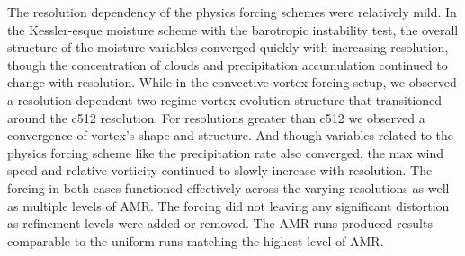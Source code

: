 The resolution
dependency of the physics forcing schemes were relatively mild.
In the Kessler-esque
moisture scheme with the barotropic instability test, 
the overall structure of the moisture variables converged quickly
with increasing resolution, though the concentration of clouds and
precipitation accumulation continued to change with resolution. While in
the convective vortex forcing setup, we observed a resolution-dependent
two regime vortex evolution structure that transitioned around
the c512 resolution. For resolutions greater than c512
we observed a convergence of vortex's shape and structure. And though
variables related to the physics forcing scheme like 
the precipitation rate also converged, the max wind speed and relative
vorticity continued to slowly increase with resolution.
The forcing in both cases functioned effectively across the varying
resolutions as well as multiple levels of AMR. The forcing
did not leaving any significant distortion as refinement levels
were added or removed. The AMR runs produced results comparable to
the uniform runs matching the highest level of AMR. 

